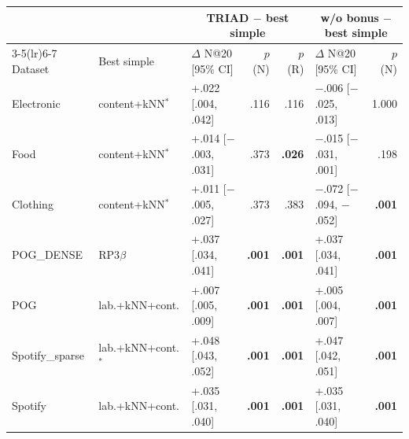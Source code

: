 \begin{tabular}{lllrrlr}
\toprule
& & \multicolumn{3}{c}{TRIAD $-$ best simple} & \multicolumn{2}{c}{w/o bonus $-$ best simple}\\
\cmidrule(lr){3-5}\cmidrule(lr){6-7}
Dataset & Best simple & $\Delta$ N@20 [95\% CI] & $p$ (N) & $p$ (R) & $\Delta$ N@20 [95\% CI] & $p$ (N)\\
\midrule
Electronic & content+kNN$^{*}$ & +.022 [.004, .042] & .116 & .116 & $-$.006 [$-$.025, .013] & 1.000\\
Food & content+kNN$^{*}$ & +.014 [$-$.003, .031] & .373 & \textbf{.026} & $-$.015 [$-$.031, .001] & .198\\
Clothing & content+kNN$^{*}$ & +.011 [$-$.005, .027] & .373 & .383 & $-$.072 [$-$.094, $-$.052] & \textbf{.001}\\
POG\_DENSE & RP3$\beta$ & +.037 [.034, .041] & \textbf{.001} & \textbf{.001} & +.037 [.034, .041] & \textbf{.001}\\
POG & lab.+kNN+cont. & +.007 [.005, .009] & \textbf{.001} & \textbf{.001} & +.005 [.004, .007] & \textbf{.001}\\
Spotify\_sparse & lab.+kNN+cont.$^{*}$ & +.048 [.043, .052] & \textbf{.001} & \textbf{.001} & +.047 [.042, .051] & \textbf{.001}\\
Spotify & lab.+kNN+cont. & +.035 [.031, .040] & \textbf{.001} & \textbf{.001} & +.035 [.031, .040] & \textbf{.001}\\
\bottomrule
\end{tabular}
